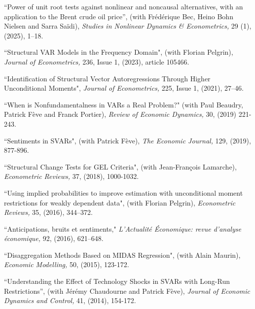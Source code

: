 \begin{description}

\item[] ``Power of unit root tests against
nonlinear and noncausal alternatives,
with an application to the Brent crude oil price'', (with Fr\'ed\'erique Bec, Heino Bohn Nielsen and Sarra Sa\"{i}di), {\it Studies in Nonlinear Dynamics \& Econometrics,} 29 (1), (2025), 1--18.

\item[]  ``Structural VAR Models in the Frequency Domain", (with Florian Pelgrin), {\it Journal of Econometrics,} 236, Issue 1, (2023), article 105466.


\item[] ``Identification of Structural Vector Autoregressions Through Higher Unconditional Moments", {\it Journal of Econometrics,} 225, Issue 1, (2021), 27--46.

\item[] ``When is Nonfundamentalness in VARs a Real Problem?" (with Paul Beaudry, Patrick F\`eve and Franck Portier), {\it Review of Economic Dynamics,} 30, (2019) 221-243.

\item[]  ``Sentiments in SVARs", (with Patrick F\`eve), {\it The Economic Journal,} 129, (2019), 877-896.

\item[] ``Structural Change Tests for GEL Criteria", (with Jean-Fran\c{c}ois Lamarche), {\it Econometric Reviews,} 37, (2018), 1000-1032.


\item ``Using implied probabilities to improve estimation with
unconditional moment restrictions for weakly dependent data", (with Florian Pelgrin),  {\it Econometric Reviews,} 35, (2016), 344--372.

\item[] ``Anticipations, bruits et sentiments,"   {\it L'Actualit\'e \'Economique: revue d'analyse \'economique,}  92, (2016), 621--648.

\item[] ``Disaggregation Methods Based on MIDAS Regression", (with Alain Maurin), {\it Economic Modelling,} 50, (2015), 123-172.

\item[] ``Understanding the Effect of Technology Shocks in SVARs with
Long-Run Restrictions'', (with J\'er\'emy Chaudourne and Patrick F\`eve),  {\it Journal of Economic Dynamics and Control,}  41, (2014), 154-172.




\end{description}
